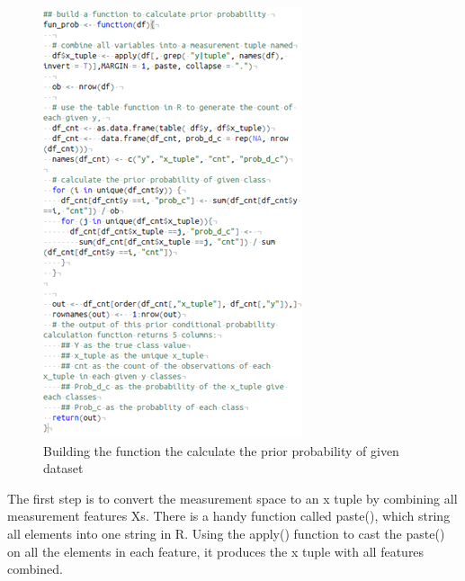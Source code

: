 \documentclass{article}
\begin{document}
\begin{multicols}{2}
        \begin{figure}[H]
            \centering
            \includegraphics[width=\linewidth]{fig4.png}
            \caption{Building the function the calculate the prior probability of given dataset}
        \end{figure}

        The first step is to convert the measurement space to an x tuple by combining all measurement features Xs. There is a handy function called paste(), which string all elements into one string in R. Using the apply() function to cast the paste() on all the elements in each feature, it produces the x tuple with all features combined.


\end{multicols}
\end{document}
